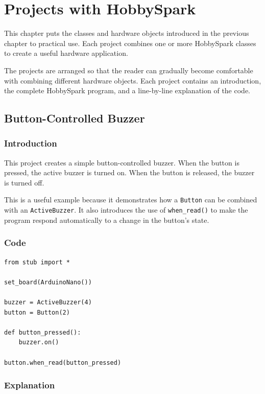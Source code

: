 \chapter{Projects with HobbySpark}

This chapter puts the classes and hardware objects introduced in the previous
chapter to practical use. Each project combines one or more HobbySpark
classes to create a useful hardware application.

The projects are arranged so that the reader can gradually become comfortable
with combining different hardware objects. Each project contains an
introduction, the complete HobbySpark program, and a line-by-line explanation
of the code.

\section{Button-Controlled Buzzer}

\subsection{Introduction}

This project creates a simple button-controlled buzzer. When the button is
pressed, the active buzzer is turned on. When the button is released, the
buzzer is turned off.

This is a useful example because it demonstrates how a \texttt{Button} can
be combined with an \texttt{ActiveBuzzer}. It also introduces the use of
\texttt{when\_read()} to make the program respond automatically to a change
in the button's state.

\subsection{Code}

\begin{lstlisting}
from stub import *

set_board(ArduinoNano())

buzzer = ActiveBuzzer(4)
button = Button(2)

def button_pressed():
    buzzer.on()

button.when_read(button_pressed)
\end{lstlisting}

\subsection{Explanation}

